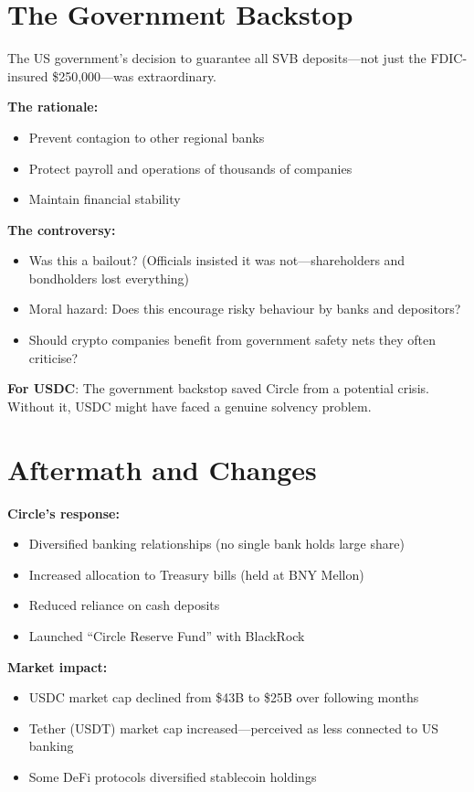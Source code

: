 \documentclass[11pt]{article}
\begin{document}
\section*{The Government Backstop}

The US government's decision to guarantee all SVB deposits---not just the FDIC-insured \$250,000---was extraordinary.

\medskip
\noindent\textbf{The rationale:}
\begin{itemize}[leftmargin=*]
\item Prevent contagion to other regional banks
\item Protect payroll and operations of thousands of companies
\item Maintain financial stability
\end{itemize}

\medskip
\noindent\textbf{The controversy:}
\begin{itemize}[leftmargin=*]
\item Was this a bailout? (Officials insisted it was not---shareholders and bondholders lost everything)
\item Moral hazard: Does this encourage risky behaviour by banks and depositors?
\item Should crypto companies benefit from government safety nets they often criticise?
\end{itemize}

\medskip
\noindent\textbf{For USDC}: The government backstop saved Circle from a potential crisis. Without it, USDC might have faced a genuine solvency problem.

\section*{Aftermath and Changes}

\textbf{Circle's response:}
\begin{itemize}[leftmargin=*]
\item Diversified banking relationships (no single bank holds large share)
\item Increased allocation to Treasury bills (held at BNY Mellon)
\item Reduced reliance on cash deposits
\item Launched ``Circle Reserve Fund'' with BlackRock
\end{itemize}

\medskip
\noindent\textbf{Market impact:}
\begin{itemize}[leftmargin=*]
\item USDC market cap declined from \$43B to \$25B over following months
\item Tether (USDT) market cap increased---perceived as less connected to US banking
\item Some DeFi protocols diversified stablecoin holdings
\end{itemize}
\end{document}
